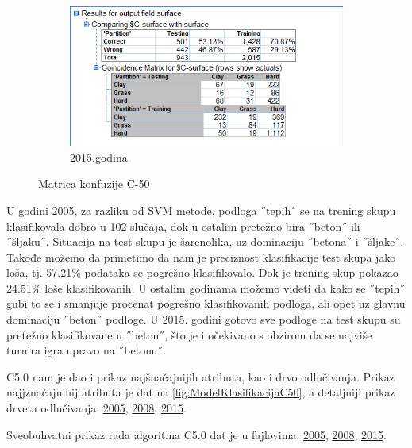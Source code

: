 \documentclass[a4paper]{article}
\begin{document}
\begin{figure}[H]
	\begin{subfigure}[h]{\textwidth}
		\begin{center}
			\includegraphics[scale=0.50]{Klasifikacija/C50/Analysis_Surface2015.png}
		\end{center}
		\caption{2015.godina}
		\label{fig:MatricaKnfuzijeC502015}
	\end{subfigure}
	
	\caption{Matrica konfuzije C-50}
	\label{fig:MatricaKnfuzijeC50}
\end{figure}

U godini 2005, za razliku od SVM metode, podloga ˝tepih˝ se na trening skupu klasifikovala dobro u 102 slučaja, dok u ostalim pretežno bira ˝beton˝ ili ˝šljaku˝. Situacija na test skupu je šarenolika, uz dominaciju ˝betona˝ i ˝šljake˝. Takođe možemo da primetimo da nam je preciznost klasifikacije test skupa jako loša, tj. 57.21\% podataka se pogrešno klasifikovalo. Dok je trening skup pokazao 24.51\% loše klasifikovanih. U ostalim godinama možemo videti da kako se ˝tepih˝ gubi to se i smanjuje procenat pogrešno klasifikovanih podloga, ali opet uz glavnu dominaciju ˝beton˝ podloge. U 2015. godini gotovo sve podloge na test skupu su pretežno klasifikovane u ˝beton˝, što je i očekivano s obzirom da se najviše turnira igra upravo na ˝betonu˝.

C5.0 nam je dao i prikaz najšnačajnijih atributa, kao i drvo odlučivanja. Prikaz najjznačajnihij atributa je dat na \ref{fig:ModelKlasifikacijaC50}, a detaljniji prikaz drveta odlučivanja: \href{file:./Klasifikacija/C50/Model_Surface2005.html}{2005}, \href{file:./Klasifikacija/C50/Model_Surface2008.html}{2008}, \href{file:./Klasifikacija/C50/Model_Surface2005.html}{2015}.  

Sveobuhvatni prikaz rada algoritma C5.0 dat je u fajlovima: \href{file:./Klasifikacija/C50/Summary_Surface2005.html}{2005}, \href{file:./Klasifikacija/C50/Summary_Surface2008.html}{2008}, \href{file:./Klasifikacija/C50/Summary_Surface2005.html}{2015}.  
\end{document}
